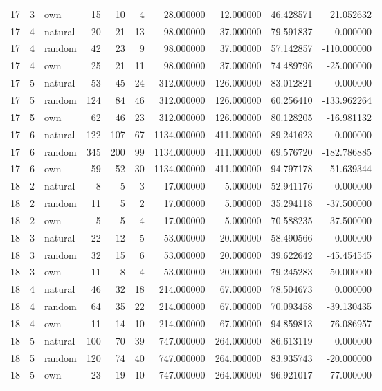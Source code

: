 \begin{table}[htbp]
\begin{tabular}{rrlrrrrrrr}
17 & 3 & own & 15 & 10 & 4 & 28.000000 & 12.000000 & 46.428571 & 21.052632 \\
17 & 4 & natural & 20 & 21 & 13 & 98.000000 & 37.000000 & 79.591837 & 0.000000 \\
17 & 4 & random & 42 & 23 & 9 & 98.000000 & 37.000000 & 57.142857 & -110.000000 \\
17 & 4 & own & 25 & 21 & 11 & 98.000000 & 37.000000 & 74.489796 & -25.000000 \\
17 & 5 & natural & 53 & 45 & 24 & 312.000000 & 126.000000 & 83.012821 & 0.000000 \\
17 & 5 & random & 124 & 84 & 46 & 312.000000 & 126.000000 & 60.256410 & -133.962264 \\
17 & 5 & own & 62 & 46 & 23 & 312.000000 & 126.000000 & 80.128205 & -16.981132 \\
17 & 6 & natural & 122 & 107 & 67 & 1134.000000 & 411.000000 & 89.241623 & 0.000000 \\
17 & 6 & random & 345 & 200 & 99 & 1134.000000 & 411.000000 & 69.576720 & -182.786885 \\
17 & 6 & own & 59 & 52 & 30 & 1134.000000 & 411.000000 & 94.797178 & 51.639344 \\
18 & 2 & natural & 8 & 5 & 3 & 17.000000 & 5.000000 & 52.941176 & 0.000000 \\
18 & 2 & random & 11 & 5 & 2 & 17.000000 & 5.000000 & 35.294118 & -37.500000 \\
18 & 2 & own & 5 & 5 & 4 & 17.000000 & 5.000000 & 70.588235 & 37.500000 \\
18 & 3 & natural & 22 & 12 & 5 & 53.000000 & 20.000000 & 58.490566 & 0.000000 \\
18 & 3 & random & 32 & 15 & 6 & 53.000000 & 20.000000 & 39.622642 & -45.454545 \\
18 & 3 & own & 11 & 8 & 4 & 53.000000 & 20.000000 & 79.245283 & 50.000000 \\
18 & 4 & natural & 46 & 32 & 18 & 214.000000 & 67.000000 & 78.504673 & 0.000000 \\
18 & 4 & random & 64 & 35 & 22 & 214.000000 & 67.000000 & 70.093458 & -39.130435 \\
18 & 4 & own & 11 & 14 & 10 & 214.000000 & 67.000000 & 94.859813 & 76.086957 \\
18 & 5 & natural & 100 & 70 & 39 & 747.000000 & 264.000000 & 86.613119 & 0.000000 \\
18 & 5 & random & 120 & 74 & 40 & 747.000000 & 264.000000 & 83.935743 & -20.000000 \\
18 & 5 & own & 23 & 19 & 10 & 747.000000 & 264.000000 & 96.921017 & 77.000000 \\

\end{tabular}
\end{table}
